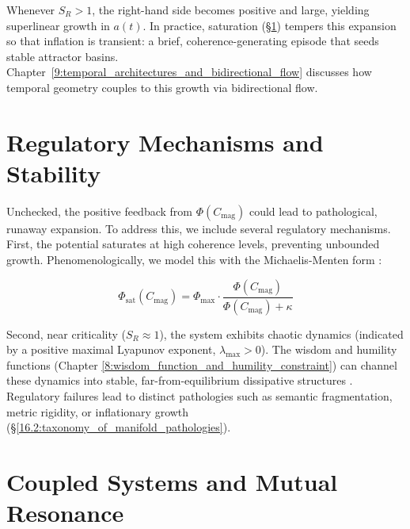 Whenever \(S_R>1\), the right-hand side becomes positive and large, yielding superlinear growth in \(a(t)\). In practice, saturation (\S\ref{7.4:regulatory_mechanisms_and_stability}) tempers this expansion so that inflation is transient: a brief, coherence-generating episode that seeds stable attractor basins. Chapter~\ref{9:temporal_architectures_and_bidirectional_flow} discusses how temporal geometry couples to this growth via bidirectional flow.


\section{Regulatory Mechanisms and Stability}
\label{7.4:regulatory_mechanisms_and_stability}

Unchecked, the positive feedback from \(\Phi(C_{\mathrm{mag}})\) could lead to pathological, runaway expansion. To address this, we include several regulatory mechanisms. First, the potential saturates at high coherence levels, preventing unbounded growth. Phenomenologically, we model this with the Michaelis-Menten form \autocite{MichaelisMenten1913}:

\begin{equation}
\Phi_{\text{sat}}(C_{\mathrm{mag}}) = \Phi_{\text{max}} \cdot \frac{\Phi(C_{\mathrm{mag}})}{\Phi(C_{\mathrm{mag}}) + \kappa}
\end{equation}

Second, near criticality (\(S_R \approx 1\)), the system exhibits chaotic dynamics (indicated by a positive maximal Lyapunov exponent, \(\lambda_{\text{max}} > 0\)). The wisdom and humility functions (Chapter \ref{8:wisdom_function_and_humility_constraint}) can channel these dynamics into stable, far-from-equilibrium dissipative structures \autocite{PrigogineStengers1984}. Regulatory failures lead to distinct pathologies such as semantic fragmentation, metric rigidity, or inflationary growth (\S\ref{16.2:taxonomy_of_manifold_pathologies}).


\section{Coupled Systems and Mutual Resonance}
\label{7.5:coupled_systems_and_mutual_resonance}

